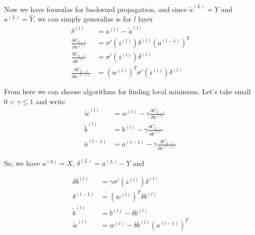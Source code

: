 \documentclass{article}
\numberwithin{equation}{section}
\theoremstyle{definition}
\theoremstyle{remark}
\begin{document}
Now we have formulas for backward propagation, and since $\tilde{a}^{(L)}=Y$ and $a^{(L)}=\hat{Y}$, we can simply generalize is for $l$ layer
\begin{align}
\delta^{(l)} &= a^{(l)} - \tilde{a}^{(l)}\\[5pt]
\frac{\partial C_{L-l}}{\partial w^{(l)}} &= \sigma' \left( z^{(l)} \right)\delta^{(l)} \left(  a^{(l-1)} \right) ^T \\[5pt]
\frac{\partial C_{L-l}}{\partial b^{(l)}} &= \sigma' \left( z^{(l)} \right)\delta^{(l)} \\[5pt]
\frac{\partial C_{L-l}}{\partial a^{(l-1)}} &= \left(  w^{(l)} \right)^T \sigma' \left( z^{(l)} \right)\delta^{(l)}
\end{align}

\noindent
From here we can choose algorithms for finding local minimum. Let's take small $0<\gamma\le1$ and write
\begin{align*}
\tilde{w}^{(l)} &= w^{(l)} - \gamma \frac{\partial C_{L-l}}{\partial w^{(l)}}\\[5pt]
\tilde{b}^{(l)} &= b^{(l)} - \gamma \frac{\partial C_{L-l}}{\partial b^{(l)}}\\[5pt]
\tilde{a}^{(l-1)} &= a^{(l-1)} - \gamma \frac{\partial C_{L-l}}{\partial a^{(l-1)}}
\end{align*}

\noindent
So, we have $a^{(0)} = X$, $\delta^{(L)} = a^{(L)} - Y$ and

\begin{align*}
\delta b^{(l)} &= \gamma \sigma' \left( z^{(l)} \right)\delta^{(l)}\\[5pt]
\delta^{(l-1)} &= \left(  w^{(l)} \right)^T \delta b^{(l)}\\[5pt]
\tilde{b}^{(l)} &= b^{(l)} - \delta b^{(l)} \\[5pt]
\tilde{w}^{(l)} &= w^{(l)} - \delta b^{(l)}  \left(  a^{(l-1)} \right)^T\\[5pt]
\end{align*}
\end{document}
